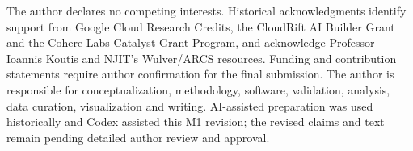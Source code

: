 \documentclass[acmsmall,screen]{acmart}
\begin{document}
The author declares no competing interests. Historical acknowledgments
identify support from Google Cloud Research Credits, the CloudRift AI Builder
Grant and the Cohere Labs Catalyst Grant Program, and acknowledge Professor
Ioannis Koutis and NJIT's Wulver/ARCS resources. Funding and contribution
statements require author confirmation for the final submission. The author
is responsible for conceptualization, methodology, software, validation,
analysis, data curation, visualization and writing. AI-assisted preparation
was used historically and Codex assisted this M1 revision; the revised
claims and text remain pending detailed author review and approval.



\end{document}
